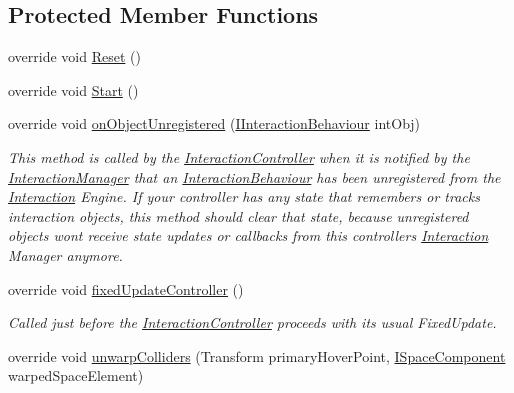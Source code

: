 \subsection*{Protected Member Functions}
\begin{DoxyCompactItemize}
\item 
override void \mbox{\hyperlink{class_leap_1_1_unity_1_1_interaction_1_1_interaction_hand_abce682528cf0c3d2bd353c3ed86e72e5}{Reset}} ()
\item 
override void \mbox{\hyperlink{class_leap_1_1_unity_1_1_interaction_1_1_interaction_hand_a83cd2a6e82f7213b6dc2f17667c6389d}{Start}} ()
\item 
override void \mbox{\hyperlink{class_leap_1_1_unity_1_1_interaction_1_1_interaction_hand_af6558dfad2bffcf4126ded024dc08c6d}{on\+Object\+Unregistered}} (\mbox{\hyperlink{interface_leap_1_1_unity_1_1_interaction_1_1_i_interaction_behaviour}{I\+Interaction\+Behaviour}} int\+Obj)
\begin{DoxyCompactList}\small\item\em This method is called by the \mbox{\hyperlink{class_leap_1_1_unity_1_1_interaction_1_1_interaction_controller}{Interaction\+Controller}} when it is notified by the \mbox{\hyperlink{class_leap_1_1_unity_1_1_interaction_1_1_interaction_manager}{Interaction\+Manager}} that an \mbox{\hyperlink{class_leap_1_1_unity_1_1_interaction_1_1_interaction_behaviour}{Interaction\+Behaviour}} has been unregistered from the \mbox{\hyperlink{namespace_leap_1_1_unity_1_1_interaction}{Interaction}} Engine. If your controller has any state that remembers or tracks interaction objects, this method should clear that state, because unregistered objects won\textquotesingle{}t receive state updates or callbacks from this controller\textquotesingle{}s \mbox{\hyperlink{namespace_leap_1_1_unity_1_1_interaction}{Interaction}} Manager anymore. \end{DoxyCompactList}\item 
override void \mbox{\hyperlink{class_leap_1_1_unity_1_1_interaction_1_1_interaction_hand_ae6c2849268e677588ab571707d5aec5b}{fixed\+Update\+Controller}} ()
\begin{DoxyCompactList}\small\item\em Called just before the \mbox{\hyperlink{class_leap_1_1_unity_1_1_interaction_1_1_interaction_controller}{Interaction\+Controller}} proceeds with its usual Fixed\+Update. \end{DoxyCompactList}\item 
override void \mbox{\hyperlink{class_leap_1_1_unity_1_1_interaction_1_1_interaction_hand_a223e3ae675f5017063a14f8f1305ed7a}{unwarp\+Colliders}} (Transform primary\+Hover\+Point, \mbox{\hyperlink{interface_leap_1_1_unity_1_1_space_1_1_i_space_component}{I\+Space\+Component}} warped\+Space\+Element)

\end{DoxyCompactItemize}
